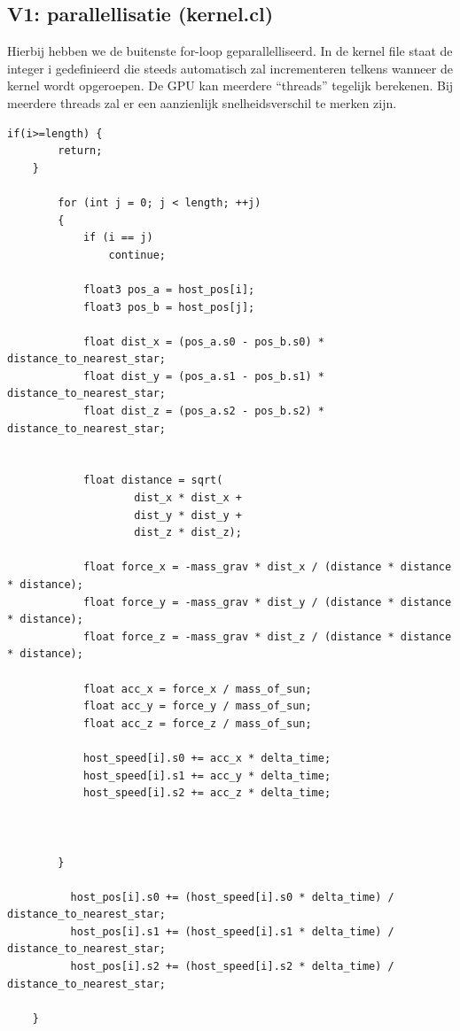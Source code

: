 \documentclass[11pt,a4paper]{article}
\begin{document}
		\subsection{V1: parallellisatie (kernel.cl)}
		Hierbij hebben we de buitenste for-loop geparallelliseerd. In de kernel file staat de integer i gedefinieerd die steeds automatisch zal incrementeren telkens wanneer de kernel wordt opgeroepen. De GPU kan meerdere “threads” tegelijk berekenen. Bij meerdere threads zal er een aanzienlijk snelheidsverschil te merken zijn.
		\begin{lstlisting}[style=CStyle]
		if(i>=length) {
		return;
	}
	
		for (int j = 0; j < length; ++j)
        {
            if (i == j)
                continue;

            float3 pos_a = host_pos[i];
            float3 pos_b = host_pos[j];

            float dist_x = (pos_a.s0 - pos_b.s0) * distance_to_nearest_star;
            float dist_y = (pos_a.s1 - pos_b.s1) * distance_to_nearest_star;
            float dist_z = (pos_a.s2 - pos_b.s2) * distance_to_nearest_star;


            float distance = sqrt(
                    dist_x * dist_x +
                    dist_y * dist_y +
                    dist_z * dist_z);

            float force_x = -mass_grav * dist_x / (distance * distance * distance);
            float force_y = -mass_grav * dist_y / (distance * distance * distance);
            float force_z = -mass_grav * dist_z / (distance * distance * distance);

            float acc_x = force_x / mass_of_sun;
            float acc_y = force_y / mass_of_sun;
            float acc_z = force_z / mass_of_sun;

            host_speed[i].s0 += acc_x * delta_time;
            host_speed[i].s1 += acc_y * delta_time;
            host_speed[i].s2 += acc_z * delta_time;



        }

      	  host_pos[i].s0 += (host_speed[i].s0 * delta_time) / distance_to_nearest_star;
      	  host_pos[i].s1 += (host_speed[i].s1 * delta_time) / distance_to_nearest_star;
       	  host_pos[i].s2 += (host_speed[i].s2 * delta_time) / distance_to_nearest_star;
   		
	}
		\end{lstlisting}
		
\end{document}
